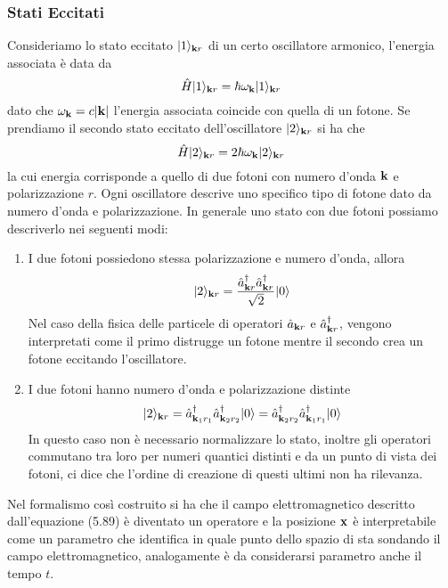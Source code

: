 \subsubsection{Stati Eccitati}
Consideriamo lo stato eccitato $|1 \rangle_{\bold{k}r}$ di un certo oscillatore armonico, l'energia associata \`e data da
\begin{equation*}
	\hat{H}|1 \rangle_{\bold{k}r} = \hbar \omega_{\bold{k}}|1 \rangle_{\bold{k}r} 
\end{equation*}
dato che $\omega_{\bold{k}} = c |\bold{k}|$ l'energia associata coincide con quella di un fotone. Se prendiamo il secondo stato eccitato dell'oscillatore $|2 \rangle_{\bold{k}r}$ si ha che 
\begin{equation*}
	\hat{H}|2 \rangle_{\bold{k}r} = 2 \hbar \omega_{\bold{k}}|2 \rangle_{\bold{k}r}
\end{equation*}
la cui energia corrisponde a quello di due fotoni con numero d'onda $\bold{k}$ e polarizzazione $r$. Ogni oscillatore descrive uno specifico tipo di fotone dato da numero d'onda e polarizzazione. In generale uno stato con due fotoni possiamo descriverlo nei seguenti modi:
\begin{enumerate}
	\item I due fotoni possiedono stessa polarizzazione e numero d'onda, allora 
	\begin{equation*}
		|2 \rangle_{\bold{k}r} = \frac{\hat{a}_{\bold{k}r}^{\dag}\hat{a}_{\bold{k}r}^{\dag}}{\sqrt{2}}|0 \rangle 
	\end{equation*}
Nel caso della fisica delle particele di operatori $\hat{a}_{\bold{k}r}$ e $\hat{a}_{\bold{k}r}^{\dag}$, vengono interpretati come il primo distrugge un fotone mentre il secondo crea un fotone eccitando l'oscillatore.
\item I due fotoni hanno numero d'onda e polarizzazione distinte 
\begin{equation*}
	|2\rangle_{\bold{k}r} = \hat{a}_{\bold{k}_1 r_1}^{\dag}\hat{a}_{\bold{k}_2 r_2}^{\dag}|0 \rangle =\hat{a}_{\bold{k}_2 r_2}^{\dag}\hat{a}_{\bold{k}_1 r_1}^{\dag}|0 \rangle   
\end{equation*}
In questo caso non \`e necessario normalizzare lo stato, inoltre gli operatori commutano tra loro per numeri quantici distinti e da un punto di vista dei fotoni, ci dice che l'ordine di creazione di questi ultimi non ha rilevanza.
\end{enumerate}
Nel formalismo cos\`i costruito si ha che il campo elettromagnetico descritto dall'equazione (5.89) \`e diventato un operatore e la posizione $\bold{x}$ \`e interpretabile come un parametro che identifica in quale punto dello spazio di sta sondando il campo elettromagnetico, analogamente \`e da considerarsi parametro anche il tempo $t$.

